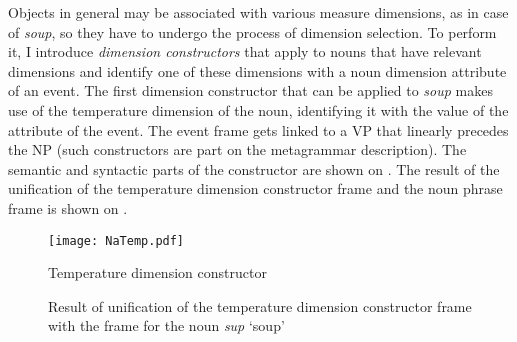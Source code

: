 Objects in general may be associated with various measure dimensions, as in case of \textit{soup}, so they have to undergo the process of dimension selection. To perform it, I introduce \textit{dimension constructors} that apply to nouns that have relevant dimensions and identify one of these dimensions with a noun dimension attribute of an event. The first dimension constructor that can be applied to \textit{soup} makes use of the temperature dimension of the noun, identifying it with the value of the attribute \NOUNDIM of the event. The event frame gets linked to a VP that linearly precedes the NP (such constructors are part on the metagrammar description). The semantic and syntactic parts of the constructor are shown on . The result of the unification of the temperature dimension constructor frame and the noun phrase frame is shown on .

\begin{figure}
\begin{minipage}{0.6\textwidth}
\end{minipage}
\begin{minipage}{0.35\textwidth}
\texttt{[image: NaTemp.pdf]}
\end{minipage}
\caption{Temperature dimension constructor\label{constructor:temp}}
\end{figure}


\begin{figure}
\centering
{}
\caption{Result of unification of the temperature dimension constructor frame with the frame for the noun \textit{sup} `soup'  \label{frame:soup:temp}}
\end{figure}

